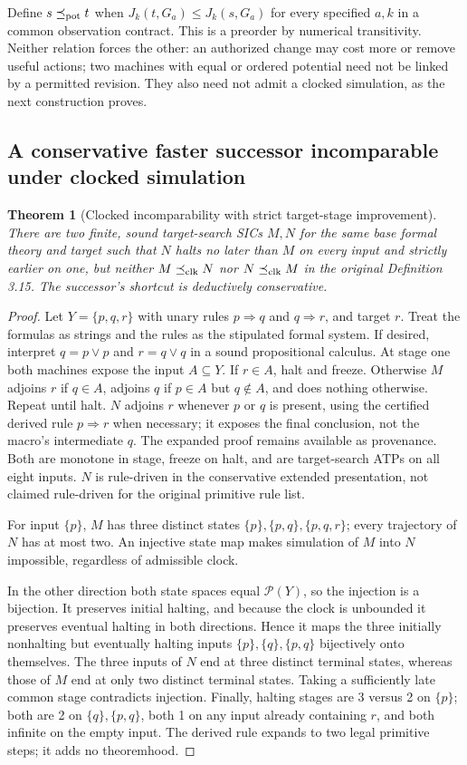 \documentclass[11pt]{article}
\newtheorem{theorem}{Theorem}[section]
\theoremstyle{remark}\newtheorem{remark}[theorem]{Remark}
\begin{document}
Define $s\preceq_{\rm pot}t$ when $J_k(t,G_a)\le J_k(s,G_a)$ for every specified $a,k$ in a common observation contract. This is a preorder by numerical transitivity. Neither relation forces the other: an authorized change may cost more or remove useful actions; two machines with equal or ordered potential need not be linked by a permitted revision. They also need not admit a clocked simulation, as the next construction proves.

\subsection{A conservative faster successor incomparable under clocked simulation}
\begin{theorem}[Clocked incomparability with strict target-stage improvement]\label{thm:incomp}
There are two finite, sound target-search SICs $M,N$ for the same base formal theory and target such that $N$ halts no later than $M$ on every input and strictly earlier on one, but neither $M\preceq_{\rm clk}N$ nor $N\preceq_{\rm clk}M$ in the original Definition 3.15. The successor's shortcut is deductively conservative.
\end{theorem}
\begin{proof}
Let $Y=\{p,q,r\}$ with unary rules $p\Rightarrow q$ and $q\Rightarrow r$, and target $r$. Treat the formulas as strings and the rules as the stipulated formal system. If desired, interpret $q=p\lor p$ and $r=q\lor q$ in a sound propositional calculus. At stage one both machines expose the input $A\subseteq Y$. If $r\in A$, halt and freeze. Otherwise $M$ adjoins $r$ if $q\in A$, adjoins $q$ if $p\in A$ but $q\notin A$, and does nothing otherwise. Repeat until halt. $N$ adjoins $r$ whenever $p$ or $q$ is present, using the certified derived rule $p\Rightarrow r$ when necessary; it exposes the final conclusion, not the macro's intermediate $q$. The expanded proof remains available as provenance. Both are monotone in stage, freeze on halt, and are target-search ATPs on all eight inputs. $N$ is rule-driven in the conservative extended presentation, not claimed rule-driven for the original primitive rule list.

For input $\{p\}$, $M$ has three distinct states $\{p\},\{p,q\},\{p,q,r\}$; every trajectory of $N$ has at most two. An injective state map makes simulation of $M$ into $N$ impossible, regardless of admissible clock.

In the other direction both state spaces equal $\mathcal P(Y)$, so the injection is a bijection. It preserves initial halting, and because the clock is unbounded it preserves eventual halting in both directions. Hence it maps the three initially nonhalting but eventually halting inputs $\{p\},\{q\},\{p,q\}$ bijectively onto themselves. The three inputs of $N$ end at three distinct terminal states, whereas those of $M$ end at only two distinct terminal states. Taking a sufficiently late common stage contradicts injection. Finally, halting stages are 3 versus 2 on $\{p\}$; both are 2 on $\{q\},\{p,q\}$, both 1 on any input already containing $r$, and both infinite on the empty input. The derived rule expands to two legal primitive steps; it adds no theoremhood.
\end{proof}
\end{document}
